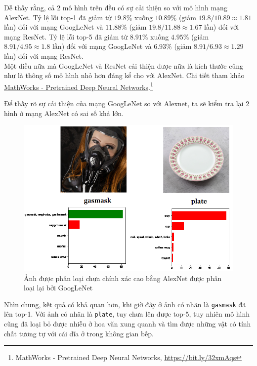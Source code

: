 \documentclass[a4paper]{article}
\begin{document}
\noindent
Dễ thấy rằng, cả 2 mô hình trên đều có sự cải thiện so với mô hình mạng AlexNet. Tỷ lệ lỗi top-1 đã giảm từ $19.8\%$ xuống $10.89\%$ (giảm $19.8/10.89 \approx 1.81$ lần) đối với mạng GoogLeNet và $11.88\%$ (giảm $19.8/11.88 \approx 1.67$ lần) đối với mạng ResNet. Tỷ lệ lỗi top-5 đã giảm từ $8.91\%$ xuống $4.95\%$ (giảm $8.91/4.95 \approx 1.8$ lần) đối với mạng GoogLeNet và $6.93\%$ (giảm $8.91/6.93 \approx 1.29$ lần) đối với mạng ResNet.\\
Một điều nữa mà GoogLeNet và ResNet cải thiện được nữa là kích thước cũng như là thông số mô hình nhỏ hơn đáng kể cho với AlexNet. Chi tiết tham khảo \href{https://www.mathworks.com/help/deeplearning/ug/pretrained-convolutional-neural-networks.html}{MathWorks - Pretrained Deep Neural Networks}.\footnote{MathWorks - Pretrained Deep Neural Networks, \href{https://bit.ly/32xmAqs}{https://bit.ly/32xmAqs}}

\newpage

\noindent
Để thấy rõ sự cải thiện của mạng GoogLeNet so với Alexnet, ta sẽ kiểm tra lại 2 hình ở mạng AlexNet có sai số khá lớn.
\begin{figure}[h!]
\centering
\includegraphics[width=15cm]{images/res3.PNG}
\caption{Ảnh được phân loại chưa chính xác cao bằng AlexNet được phân loại lại bởi GoogLeNet}
\end{figure}

\noindent
Nhìn chung, kết quả có khả quan hơn, khi giờ đây ở ảnh có nhãn là \texttt{gasmask} đã lên top-1. Với ảnh có nhãn là \texttt{plate}, tuy chưa lên được top-5, tuy nhiên mô hình cũng đã loại bỏ được nhiễu ở hoa văn xung quanh và tìm được những vật có tính chất tương tự với cái dĩa ở trong không gian bếp.
\end{document}
